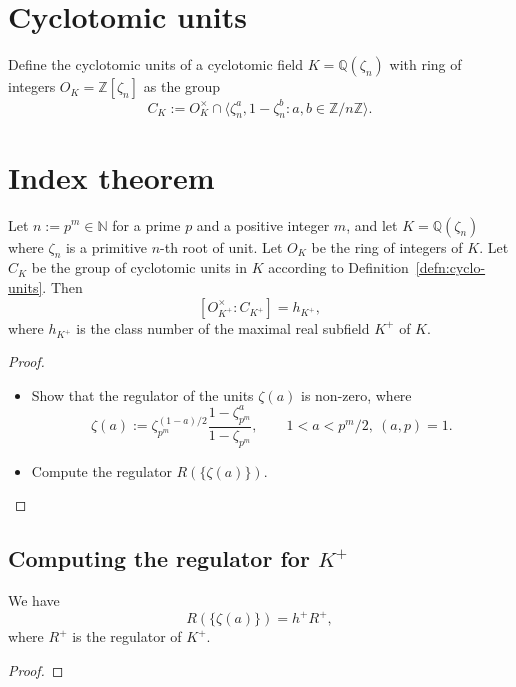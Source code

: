 \section{Cyclotomic units}
\begin{definition}\label{defn:cyclo_units}
    Define the cyclotomic units of a cyclotomic field $K = \mathbb{Q}(\zeta_n)$ with ring of integers 
    $O_K = \mathbb{Z}[\zeta_n]$ as the group 
    $$
    C_K := O_K^\times \cap \langle \zeta_n^a, 1 - \zeta_n^b \colon a, b \in \mathbb{Z} / n \mathbb{Z}\rangle. 
    $$
\end{definition}

\section{Index theorem}
\begin{theorem}\label{thm:index_of_units}
    \notready
    Let $n := p^m \in \mathbb{N}$ for a prime $p$ and a positive integer $m$, and let $K = \mathbb{Q}(\zeta_n)$ where $\zeta_n$ is a primitive $n$-th root of unit. 
    Let $O_K$ be the ring of integers of $K$. 
    Let $C_K$ be the group of cyclotomic units in $K$ according to Definition~\ref{defn:cyclo-units}.
    Then
    \[
        [O_{K^+}^\times : C_{K^+}] = h_{K^+},
    \]
    where $h_{K^+}$ is the class number of the maximal real subfield $K^+$ of $K$.
\end{theorem}

\begin{proof}
    \begin{itemize}
        \item Show that the regulator of the units $\zeta(a)$ is non-zero, where 
        $$
        \zeta(a) := \zeta_{p^m}^{(1-a)/2} \frac{1 - \zeta_{p^m}^a}{1 - \zeta_{p^m}}, \qquad 1 < a < p^m / 2, \ (a, p) = 1.
        $$
        \item Compute the regulator $R(\{\zeta(a)\})$. 
    \end{itemize}
\end{proof}

\subsection{Computing the regulator for $K^+$}

\begin{lemma}\label{lem:reg_Ra}
    We have
    $$
    R(\{\zeta(a)\}) = h^+ R^+, 
    $$
    where $R^+$ is the regulator of $K^+$.
\end{lemma}

\begin{proof}
\end{proof}

